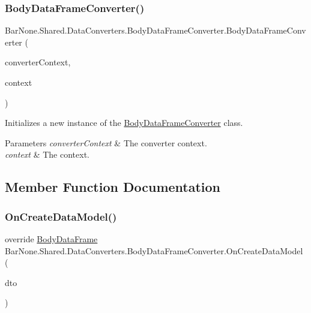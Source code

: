 \subsubsection{\texorpdfstring{Body\+Data\+Frame\+Converter()}{BodyDataFrameConverter()}}
{\footnotesize\ttfamily Bar\+None.\+Shared.\+Data\+Converters.\+Body\+Data\+Frame\+Converter.\+Body\+Data\+Frame\+Converter (\begin{DoxyParamCaption}\item[{\mbox{\hyperlink{class_bar_none_1_1_shared_1_1_data_converters_1_1_converters}{Converters}}}]{converter\+Context,  }\item[{\mbox{\hyperlink{interface_bar_none_1_1_shared_1_1_core_1_1_i_domain_context}{I\+Domain\+Context}}}]{context }\end{DoxyParamCaption})}



Initializes a new instance of the \mbox{\hyperlink{class_bar_none_1_1_shared_1_1_data_converters_1_1_body_data_frame_converter}{Body\+Data\+Frame\+Converter}} class. 


\begin{DoxyParams}{Parameters}
{\em converter\+Context} & The converter context.\\
\hline
{\em context} & The context.\\
\hline
\end{DoxyParams}


\subsection{Member Function Documentation}
\mbox{\label{class_bar_none_1_1_shared_1_1_data_converters_1_1_body_data_frame_converter_ab48f64b8447cfd1542d5fa57449cf3c5}} 
\subsubsection{\texorpdfstring{On\+Create\+Data\+Model()}{OnCreateDataModel()}}
{\footnotesize\ttfamily override \mbox{\hyperlink{class_bar_none_1_1_shared_1_1_domain_model_1_1_body_data_frame}{Body\+Data\+Frame}} Bar\+None.\+Shared.\+Data\+Converters.\+Body\+Data\+Frame\+Converter.\+On\+Create\+Data\+Model (\begin{DoxyParamCaption}\item[{\mbox{\hyperlink{class_bar_none_1_1_shared_1_1_data_transfer_1_1_body_data_frame_d_t_o}{Body\+Data\+Frame\+D\+TO}}}]{dto }\end{DoxyParamCaption})}



